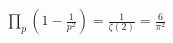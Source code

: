 \documentclass[preview]{standalone}
\begin{document}
\begin{align*}
\prod_{p} \left(1 - \frac{1}{p^2}\right) = \frac{1}{\zeta(2)} = \frac{6}{\pi^2}
\end{align*}
\end{document}
